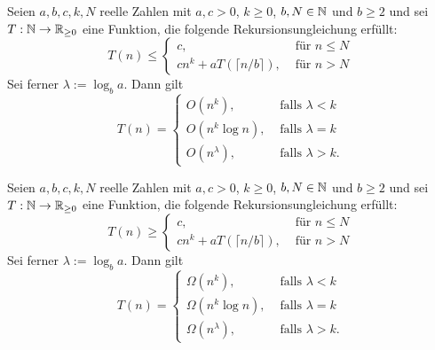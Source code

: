 \documentclass{cheat-sheet}
\begin{document}
\begin{satz}
  Seien $a, b, c, k, N$ reelle Zahlen mit $a, c > 0$, $k \geq 0$, $b, N \in \mathbb{N}$ und $b \geq 2$ und sei $T : \mathbb{N} \to \mathbb{R}_{\geq 0}$ eine Funktion, die folgende Rekursionsungleichung erfüllt:
  \[ T(n) \leq \begin{cases}
    c, & \text{ für } n \leq N \\
    c n^k + a T(\lceil n / b \rceil), & \text{ für } n > N
  \end{cases} \]
  Sei ferner $\lambda := \log_b a$. Dann gilt
  \[ T(n) = \begin{cases}
    O(n^k), & \text{ falls } \lambda < k \\
    O(n^k \log n), & \text{ falls } \lambda = k \\
    O(n^\lambda), & \text{ falls } \lambda > k.
  \end{cases} \]
\end{satz}

\begin{satz}
  Seien $a, b, c, k, N$ reelle Zahlen mit $a, c > 0$, $k \geq 0$, $b, N \in \mathbb{N}$ und $b \geq 2$ und sei $T : \mathbb{N} \to \mathbb{R}_{\geq 0}$ eine Funktion, die folgende Rekursionsungleichung erfüllt:
  \[ T(n) \geq \begin{cases}
    c, & \text{ für } n \leq N \\
    c n^k + a T(\lceil n / b \rceil), & \text{ für } n > N
  \end{cases} \]
  Sei ferner $\lambda := \log_b a$. Dann gilt
  \[ T(n) = \begin{cases}
    \Omega(n^k), & \text{ falls } \lambda < k \\
    \Omega(n^k \log n), & \text{ falls } \lambda = k \\
    \Omega(n^\lambda), & \text{ falls } \lambda > k.
  \end{cases} \]
\end{satz}

\iffalse
  \begin{satz}
    Seien $\beta, c, k, n$ reelle Zahlen mit $c, k > 0$, $n \in \N_0$ und $0 < \beta < 1$ und sei $T : \N_0 \to \R_{\geq 0}$ eine Funktion, die folgende Rekursionsungleichung erfüllt:
    \[ T(n) \leq \begin{cases}
      c, & \text{ für } n \leq N \\
      c n^k + T(\lfloor \beta n \rfloor), & \text{ für } n > N.
    \end{cases} \]
    Dann ist $T(n) = O(n^k)$
  \end{satz}
\fi
\end{document}
